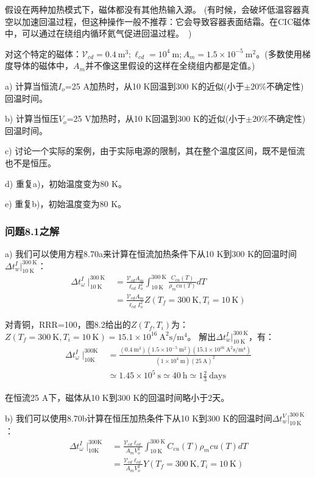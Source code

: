 假设在两种加热模式下，磁体都没有其他热输入源。
(有时候，会破坏低温容器真空以加速回温过程，但这种操作一般不推荐：它会导致容器表面结霜。在CIC磁体中，可以通过在绕组内循环氦气促进回温过程。~)

对这个特定的磁体：$\mathcal{V}_{cd}=0.4\ \mathrm{m^3};\ell_{cd}=10^4\ \mathrm{m};A_m=1.5\times 10^{-5}\ \mathrm{m^2}$。(多数使用梯度导体的磁体中，$A_m$并不像这里假设的这样在全绕组内都是定值。)

a) 计算当恒流$I_o$=25 A加热时，从10 K回温到300 K的近似(小于$\pm 20\%$不确定性)回温时间。

b) 计算当恒压$V_o$=25 V加热时，从10 K回温到300 K的近似(小于$\pm 20\%$不确定性)回温时间。

c) 讨论一个实际的案例，由于实际电源的限制，其在整个温度区间，既不是恒流也不是恒压。

d) 重复a)，初始温度变为80 K。

e) 重复b)，初始温度变为80 K。

\subsubsection{问题8.1之解}
a) 我们可以使用方程8.70a来计算在恒流加热条件下从10 K到300 K的回温时间$\Delta t_w^I|_{10\ \mathrm{K}}^{300\ \mathrm{K}}$：
\begin{align*}%
\Delta t_{\omega}^{I}\mid_{10\ \mathrm{K}}^{300\ \mathrm{K}}&=\frac{\mathcal{V}_{cd}A_m}{\ell_{cd}I_{o}^{2}}\int_{10\ \mathrm{K}}^{300\ \mathrm{K}}\frac{C_{cu}(T)}{\rho_m{cu}(T)}dT \\
&=\frac{\mathcal{V}_{cd}A_m}{\ell_{cd}I_{o}^{2}}Z(T_f=300\ \mathrm{K},T_i=10\ \mathrm{K}) \tag{S1.1}
\end{align*}

对青铜，RRR=100，图8.2给出的$Z(T_f,T_i)$为：
$Z(T_f=300\ \mathrm{K},T_i=10\ \mathrm{K})=15.1\times 10^{16}\ \mathrm{A^2 s/m^4}$。
解出$\Delta t_w^I|_{10\ \mathrm{K}}^{300\ \mathrm{K}}$，有：
\begin{align*}%
\Delta t_{\omega}^{I}\mid_{10\mathrm{K}}^{300\mathrm{K}}&=\frac{(0.4\ \mathrm{m^3})(1.5\times 10^{-5}\ \mathrm{m^2})(15.1\times 10^{16}\ \mathrm{A^2s/m^4})}{(1\times 10^4\ \mathrm{m})(25\ \mathrm{A})^2} \\
&\simeq 1.45\times 10^5\ \mathrm{s}\simeq 40\ \mathrm{h}\simeq 1\frac{2}{3}\ \mathrm{days}  \tag{S1.2}
\end{align*}

在恒流25 A下，磁体从10 K到300 K的回温时间略小于2天。

b) 我们可以使用8.70b计算在恒压加热条件下从10 K到300 K的回温时间$\Delta t_w^V|_{10\ \mathrm{K}}^{300\ \mathrm{K}}$：
\begin{align*}%
\Delta t_{\omega}^{I}\mid_{10\mathrm{K}}^{300\mathrm{K}}&=\frac{\mathcal{V}_{cd}\ell_{cd}}{A_mV_{o}^{2}}\int_{10\ \mathrm{K}}^{300\ \mathrm{K}}C_{cu}(T)\rho_m{cu}(T)dT \\
&=\frac{\mathcal{V}_{cd}\ell_{cd}}{A_mV_{o}^{2}}Y(T_f=300\ \mathrm{K},T_i=10\ \mathrm{K})\tag{S1.3}
\end{align*}

